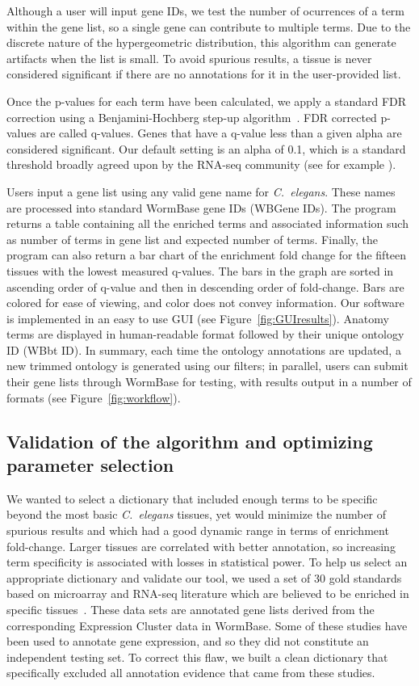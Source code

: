 \documentclass{bmcart}
\begin{document}
Although a user will input gene IDs, we test the number of ocurrences of a term within the gene list, so a single gene can contribute to multiple terms. Due to the discrete nature of the hypergeometric distribution, this algorithm can generate artifacts when the list is small. To avoid spurious results, a tissue is never considered significant if there are no annotations for it in the user-provided list.

Once the p-values for each term have been calculated, we apply a standard FDR correction using a Benjamini-Hochberg step-up algorithm~\cite{Benjamini1995}. FDR corrected p-values are called q-values. Genes that have a q-value less than a given alpha are considered significant. Our default setting is an alpha of 0.1, which is a standard threshold broadly agreed upon by the RNA-seq community (see for example \cite{Love2014}). 

Users input a gene list using any valid gene name for \emph{C.~elegans}. These names are processed into standard WormBase gene IDs (WBGene IDs). The program returns a table containing all the enriched terms and associated  information such as number of terms in gene list and expected number of terms. Finally, the program can also return a bar chart of the enrichment fold change for the fifteen tissues with the lowest measured q-values. The bars in the graph are sorted in ascending order of q-value and then in descending order of fold-change. Bars are colored for ease of viewing, and color does not convey information. Our software is implemented in an easy to use GUI (see Figure~\ref{fig:GUIresults}). Anatomy terms are displayed in human-readable format followed by their unique ontology ID (WBbt ID). In summary, each time the ontology annotations are updated, a new trimmed ontology is generated using our filters; in parallel, users can submit their gene lists through WormBase for testing, with results output in a number of formats (see Figure~\ref{fig:workflow}).

\subsection*{Validation of the algorithm and optimizing parameter selection}
We wanted to select a dictionary that included enough terms to be specific beyond the most basic \emph{C.~elegans} tissues, yet would minimize the number of spurious results and which had a good dynamic range in terms of enrichment fold-change. Larger tissues are correlated with better annotation, so increasing term specificity is associated with losses in statistical power. To help us select an appropriate dictionary and validate our tool, we used a set of 30 gold standards based on microarray and RNA-seq literature which are believed to be enriched in specific tissues~\cite{Gaudet2004a, Spencer2011, Cinar2005, Watson2008a, Pauli2006, Portman2004, Fox2007, Smith2010}. These data sets are annotated gene lists derived from the corresponding Expression Cluster data in WormBase. Some of these studies have been used to annotate gene expression, and so they did not constitute an independent testing set. To correct this flaw, we built a clean dictionary that specifically excluded all annotation evidence that came from these studies.
\end{document}
